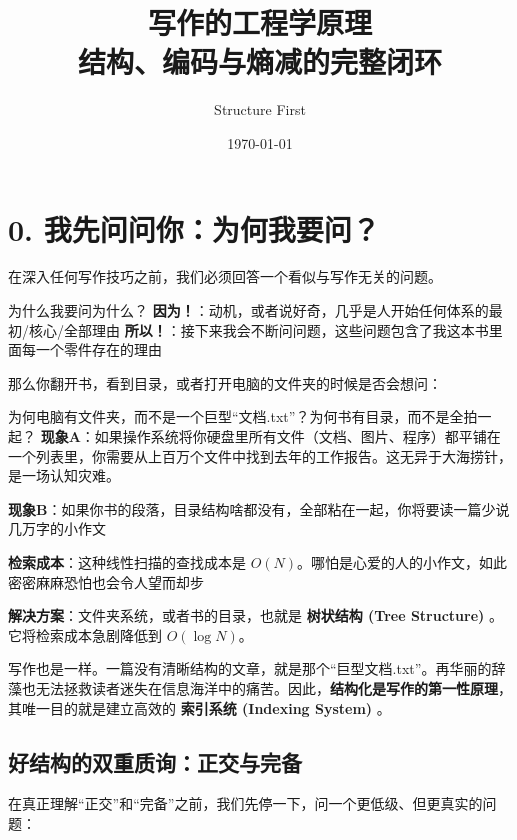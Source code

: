\documentclass[11pt, a4paper]{ctexart}
\title{\textbf{\Huge 写作的工程学原理}\\ \Large 结构、编码与熵减的完整闭环}
\author{Structure First}
\date{\today}
\newcommand{\lowfreq}[1]{%
	{\Large\bfseries\color{red!60!black} #1}%
}
\begin{document}
	
	\maketitle
	\tableofcontents
	\newpage
	
	\section*{0. 我先问问你：为何我要问？}
	
	在深入任何写作技巧之前，我们必须回答一个看似与写作无关的问题。
		\begin{thinkbox}{为什么我要问为什么？}
		\textbf{因为！}：动机，或者说好奇，几乎是人开始任何体系的最初/核心/全部理由
		\textbf{所以！}：接下来我会不断问问题，这些问题包含了我这本书里面每一个零件存在的理由
	\end{thinkbox}
	
	那么你翻开书，看到目录，或者打开电脑的文件夹的时候是否会想问：
	\begin{thinkbox}{为何电脑有文件夹，而不是一个巨型“文档.txt”？为何书有目录，而不是全拍一起？}
		\textbf{现象A}：如果操作系统将你硬盘里所有文件（文档、图片、程序）都平铺在一个列表里，你需要从上百万个文件中找到去年的工作报告。这无异于大海捞针，是一场认知灾难。
		
		\textbf{现象B}：如果你书的段落，目录结构啥都没有，全部粘在一起，你将要读一篇少说几万字的小作文
		
		\textbf{检索成本}：这种线性扫描的查找成本是 $O(N)$。哪怕是心爱的人的小作文，如此密密麻麻恐怕也会令人望而却步
		
		\textbf{解决方案}：文件夹系统，或者书的目录，也就是\lowfreq{树状结构 (Tree Structure)}。它将检索成本急剧降低到 $O(\log N)$。
	\end{thinkbox}
	
	写作也是一样。一篇没有清晰结构的文章，就是那个“巨型文档.txt”。再华丽的辞藻也无法拯救读者迷失在信息海洋中的痛苦。因此，\textbf{结构化是写作的第一性原理}，其唯一目的就是建立高效的\lowfreq{索引系统 (Indexing System)}。
	
\subsection{好结构的双重质询：正交与完备}

在真正理解“正交”和“完备”之前，我们先停一下，问一个更低级、但更真实的问题：
\end{document}

